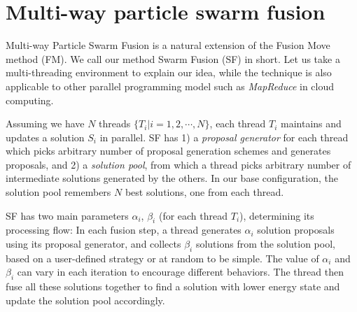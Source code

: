 \section{Multi-way particle swarm fusion} \label{section:algorithm}
Multi-way Particle Swarm Fusion is a natural extension of the Fusion
Move method (FM). We call our method Swarm Fusion (SF) in short. Let us
take a multi-threading environment to explain our idea, while the
technique is also applicable to other parallel programming model such as
{\it MapReduce} in cloud computing.
%

Assuming we have $N$ threads $\{T_i | i=1, 2, \cdots, N\}$,
each thread $T_i$ maintains and updates a solution $S_i$ in
parallel.
SF has 1) a {\it proposal generator} for each thread which picks
arbitrary number of proposal generation schemes and generates proposals,
and 2) a {\it solution pool}, from which a thread picks arbitrary number
of intermediate solutions generated by the others.
%
%
In our base configuration, the solution pool remembers $N$ best
solutions, one from each thread.

SF has two main parameters $\alpha_i$, $\beta_i$ (for each thread
$T_i$), determining its processing flow: In each fusion step, a thread
generates $\alpha_i$ solution proposals using its proposal generator, and collects
$\beta_i$ solutions from the solution pool, based on a user-defined
strategy or at random to be simple. The value of $\alpha_i$ and
$\beta_i$ can vary in each iteration to encourage different behaviors.
The thread then fuse all these solutions together to find a solution
with lower energy state and update the solution pool accordingly.
%


